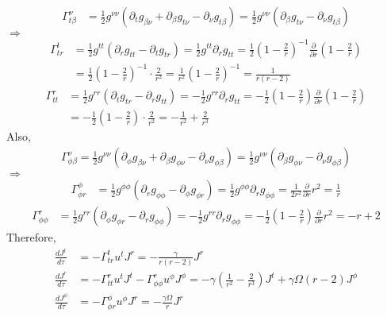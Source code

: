 \documentclass[12pt]{article}
\begin{document}
\begin{align}
\Gamma^{\nu}_{t \beta} &= \frac{1}{2} g^{\nu \nu} \left(\partial_{t} g_{\beta \nu} + \partial_{\beta} g_{t \nu} - \partial_{\nu} g_{t \beta}\right) = \frac{1}{2} g^{\nu \nu} \left(\partial_{\beta} g_{t \nu} - \partial_{\nu} g_{t \beta}\right)
\end{align}
$\Rightarrow$
\begin{align}
\Gamma^{t}_{t r} &= \frac{1}{2} g^{t t} \left(\partial_{r} g_{t t} - \partial_{t} g_{t r}\right) = \frac{1}{2} g^{t t} \partial_{r} g_{t t} = \frac{1}{2} \left(1 - \frac{2}{r} \right)^{-1} \frac{\partial}{\partial r} \left(1 - \frac{2}{r} \right) \nonumber\\
&= \frac{1}{2} \left(1 - \frac{2}{r} \right)^{-1} \cdot \frac{2}{r^2} = \frac{1}{r^2} \left(1 - \frac{2}{r} \right)^{-1} = \frac{1}{r \left(r - 2\right)}
\end{align}
\begin{align}
\Gamma^{r}_{t t} &= \frac{1}{2} g^{r r} \left(\partial_{t} g_{t r} - \partial_{r} g_{t t}\right) = - \frac{1}{2} g^{r r} \partial_{r} g_{t t} = - \frac{1}{2} \left(1 - \frac{2}{r} \right) \frac{\partial}{\partial r} \left(1 - \frac{2}{r} \right)\\
&= - \frac{1}{2} \left(1 - \frac{2}{r} \right) \cdot \frac{2}{r^2} = - \frac{1}{r^2} + \frac{2}{r^3}
\end{align}
Also,
\begin{align}
\Gamma^{\nu}_{\phi \beta} = \frac{1}{2} g^{\nu \nu} \left(\partial_{\phi} g_{\beta \nu} + \partial_{\beta} g_{\phi \nu} - \partial_{\nu} g_{\phi \beta}\right) = \frac{1}{2} g^{\nu \nu} \left(\partial_{\beta} g_{\phi \nu} - \partial_{\nu} g_{\phi \beta}\right)
\end{align}
$\Rightarrow$
\begin{align}
\Gamma^{\phi}_{\phi r} &= \frac{1}{2} g^{\phi \phi} \left(\partial_{r} g_{\phi \phi} - \partial_{\phi} g_{\phi r}\right) = \frac{1}{2} g^{\phi \phi} \partial_{r} g_{\phi \phi} = \frac{1}{2 r^2} \frac{\partial}{\partial r} r^2 = \frac{1}{r}
\end{align}
\begin{align}
\Gamma^{r}_{\phi \phi} &= \frac{1}{2} g^{r r} \left(\partial_{\phi} g_{\phi r} - \partial_{r} g_{\phi \phi}\right) =  - \frac{1}{2} g^{r r} \partial_{r} g_{\phi \phi} = - \frac{1}{2} \left(1 - \frac{2}{r} \right) \frac{\partial}{\partial r} r^2 = - r + 2
\end{align}
Therefore,
\begin{align}
\frac{d J^{t}}{d \tau} &= - \Gamma^{t}_{t r} u^{t} J^{r} = - \frac{\gamma}{r \left(r - 2\right)} J^{r}\\
\frac{d J^{r}}{d \tau} &= - \Gamma^{r}_{t t} u^{t} J^{t} - \Gamma^{r}_{\phi \phi} u^{\phi} J^{\phi} = - \gamma \left(\frac{1}{r^2} - \frac{2}{r^3}\right) J^{t} + \gamma \Omega \left(r - 2 \right) J^{\phi}\\
\frac{d J^{\phi}}{d \tau} &= - \Gamma^{\phi}_{\phi r} u^{\phi} J^{r} = - \frac{\gamma \Omega}{r} J^{r}
\end{align}
\end{document}
